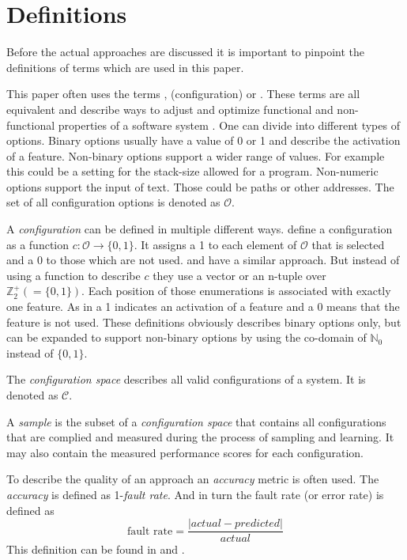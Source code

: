 \section{Definitions}

Before the actual approaches are discussed it is important to pinpoint the definitions of terms which are used in this paper.

This paper often uses the terms , (configuration)  or . These terms are all equivalent and describe ways to adjust and optimize functional and non-functional properties of a software system \cite{DistanceBasedSampling2019}.
One can divide into different types of options. Binary options usually have a value of 0 or 1 and describe the activation of a feature. Non-binary options support a wider range of values. For example this could be a setting for the stack-size allowed for a program. Non-numeric options support the input of text. Those could be paths or other addresses.
The set of all configuration options is denoted as $\mathcal{O}$.

A \textit{configuration} can be defined in multiple different ways. \citet{DistanceBasedSampling2019} define a configuration as a function $c : \mathcal{O} \rightarrow \{0,1\}$. It assigns a 1 to each element of $\mathcal{O}$ that is selected and a 0 to those which are not used. \citet{VariabilityAwarePerformancePredictionJianmeiSigmundApel} and
\citet{FasterDiscoveryofFasterSystemConfigurationsSiegmund2017} have a similar approach. But instead of using a function to describe $c$ they use a vector or an n-tuple over $\mathbb{Z}^+_2(= \{0,1\})$. Each position of those enumerations is associated with exactly one feature. As in \citet{DistanceBasedSampling2019} a 1 indicates an activation of a feature and a 0 means that the feature is not used. These definitions obviously describes binary options only, but can be expanded to support non-binary options by using the co-domain of $\mathbb{N}_0$ instead of $\{0,1\}$.

The \textit{configuration space} describes all valid configurations of a system. It is denoted as $\mathcal{C}$.

A \textit{sample} is the subset of a \textit{configuration space} that contains all configurations that are complied and measured during the process of sampling and learning. It may also contain the measured performance scores for each configuration.

To describe the quality of an approach an \textit{accuracy} metric is often used. The \textit{accuracy} is defined as 1-\textit{fault rate}. And in turn the fault rate (or error rate) is defined as 
\begin{equation}
	\text{fault rate}= \frac{|actual-predicted|}{actual}
\end{equation} This definition can be found in \cite{FasterDiscoveryofFasterSystemConfigurationsSiegmund2017} and \cite{AutomatedFeatureDetectionSiegmund2012}.